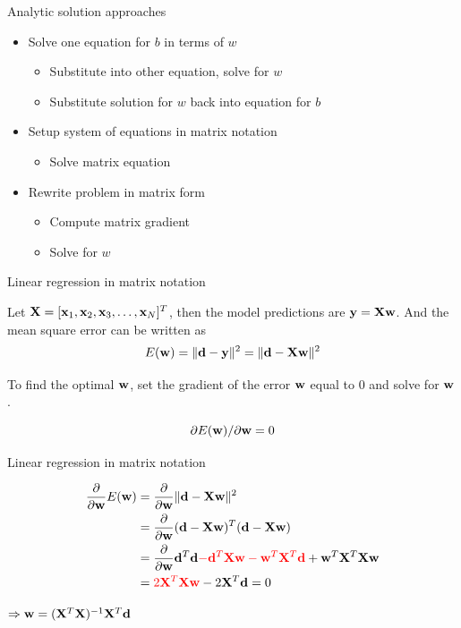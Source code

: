 \documentclass[notes]{beamer}
\providecommand{\tightlist}{%
  \setlength{\itemsep}{0pt}\setlength{\parskip}{0pt}}
\begin{document}
\begin{frame}{Analytic solution approaches}

\begin{itemize}
\tightlist
\item
  Solve one equation for \(b\) in terms of \(w\)

  \begin{itemize}
  \tightlist
  \item
    Substitute into other equation, solve for \(w\)
  \item
    Substitute solution for \(w\) back into equation for \(b\)
  \end{itemize}
\item
  Setup system of equations in matrix notation

  \begin{itemize}
  \tightlist
  \item
    Solve matrix equation
  \end{itemize}
\item
  Rewrite problem in matrix form

  \begin{itemize}
  \tightlist
  \item
    Compute matrix gradient
  \item
    Solve for \(w\)
  \end{itemize}
\end{itemize}

\end{frame}

\begin{frame}{Linear regression in matrix notation}

Let \(\mathbf{X} = [\mathbf{x}_1 ,\mathbf{x}_2 ,\mathbf{x}_3 ,\dots ,\mathbf{x}_N]^T\), then the model
predictions are \(\mathbf{y}=\mathbf{X} \mathbf{w}\). And the mean square error can be
written as \[E(\mathbf{w})=\|\mathbf{d} - \mathbf{y}\|^2 = \|\mathbf{d} -\mathbf{X} \mathbf{w}\|^2\]

To find the optimal \(\mathbf{w}\), set the gradient of the error \wrt \(\mathbf{w}\)
equal to 0 and solve for \(\mathbf{w}\).

\[\partial E(\mathbf{w}) / \partial \mathbf{w}=0\]

\end{frame}

\begin{frame}{Linear regression in matrix notation}

\begin{equation*}
\begin{aligned}
\frac{\partial}{\partial \mathbf{w}} E(\mathbf{w}) & = \frac{\partial}{\partial \mathbf{w}} \| \mathbf{d} - \mathbf{X} \mathbf{w} \|^2 \\  
&= \frac{\partial}{\partial \mathbf{w}} (\mathbf{d} -\mathbf{X} \mathbf{w})^T(\mathbf{d} -\mathbf{X} \mathbf{w}) \\ 
&= \frac{\partial}{\partial \mathbf{w}} \mathbf{d}^T \mathbf{d} \textcolor{red}{- \mathbf{d}^T \mathbf{X} \mathbf{w} - \mathbf{w}^T \mathbf{X}^T \mathbf{d} }+ \mathbf{w}^T \mathbf{X}^T \mathbf{X} \mathbf{w} \\ 
&=\textcolor{red}{ 2 \mathbf{X}^T \mathbf{X} \mathbf{w}} -2 \mathbf{X}^T \mathbf{d}  = 0
\end{aligned}
\end{equation*}

\(\Rightarrow \mathbf{w} = (\mathbf{X} ^T \mathbf{X})^{-1} \mathbf{X}^T \mathbf{d}\)

\end{frame}
\end{document}
